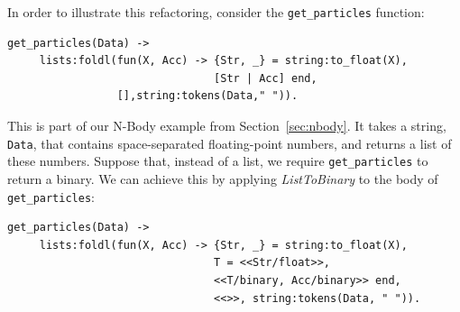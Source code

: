 \documentclass[final]{jfp1}
\begin{document}
In order to illustrate this refactoring, consider the \lstinline{get_particles} function:
% 
\begin{lstlisting}
get_particles(Data) ->
     lists:foldl(fun(X, Acc) -> {Str, _} = string:to_float(X),
                                [Str | Acc] end,
                 [],string:tokens(Data," ")).
\end{lstlisting}
% 
\noindent
This is part of our N-Body example from Section~\ref{sec:nbody}. It takes a
string, \lstinline{Data}, that contains space-separated floating-point numbers,
and returns a list of these numbers. Suppose that, instead of a list, we require
\lstinline{get_particles} to return a binary.
We can achieve this by applying \emph{ListToBinary} to the body of
\lstinline{get_particles}:
% 
\begin{lstlisting}
get_particles(Data) ->
     lists:foldl(fun(X, Acc) -> {Str, _} = string:to_float(X),
                                T = <<Str/float>>,
                                <<T/binary, Acc/binary>> end,
                                <<>>, string:tokens(Data, " ")).
\end{lstlisting}
% 
\end{document}
